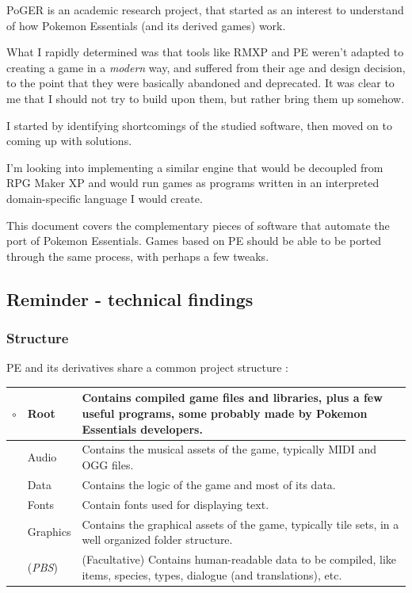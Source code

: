 \documentclass[11pt]{article}
\begin{document}
PoGER is an academic research project, that started as an interest to understand of how Pokemon Essentials (and its derived games) work.

What I rapidly determined was that tools like RMXP and PE weren't adapted to creating a game in a \textit{modern} way, and suffered from their age and design decision, to the point that they were basically abandoned and deprecated. It was clear to me that I should not try to build upon them, but rather bring them up somehow.

I started by identifying shortcomings of the studied software, then moved on to coming up with solutions.

I'm looking into implementing a similar engine that would be decoupled from RPG Maker XP  and would run games as programs written in an interpreted domain-specific language I would create. 

This document covers the complementary pieces of software that automate the port of Pokemon Essentials. Games based on PE should be able to be ported through the same process, with perhaps a few tweaks.


\subsection{Reminder - technical findings}

\subsubsection{Structure}

PE and its derivatives share a common project structure :

\begin{tabular}{|r L{.1\linewidth}|L{.8\linewidth}|}
	\hline
	$\circ$ & Root & Contains compiled game files and libraries, plus a few useful programs, some probably made by Pokemon Essentials developers. \\
	\hline
	 & Audio & Contains the musical assets of the game, typically MIDI and OGG files. \\
	\hline
	 & Data & Contains the logic of the game and most of its data.  \\
	\hline
	 & Fonts & Contain fonts used for displaying text. \\
	\hline
	 & Graphics & Contains the graphical assets of the game, typically tile sets, in a well organized folder structure. \\
	\hline
	 & (\textit{PBS}) & (Facultative) Contains human-readable data to be compiled, like items, species, types, dialogue (and translations), etc. \\
	\hline
\end{tabular}
\end{document}
